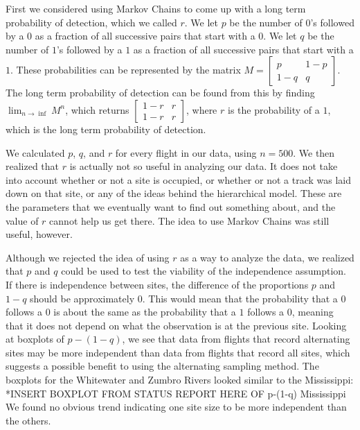 \documentclass{article}
\begin{document}
		First we considered using Markov Chains to come up with a long term 
probability of detection, which we called \(r\).  We let \(p\) be the number of 
\(0\)'s followed by a \(0\) as a fraction of all successive pairs that start 
with a \(0\).  We let \(q\) be the number of \(1\)'s followed by a \(1\) as a 
fraction of all successive pairs that start with a \(1\).  These probabilities 
can be represented by the matrix \(M = \begin{bmatrix} p & 1-p \\ 1-q & q 
\end{bmatrix}\). The long term probability of detection can be found from this 
by finding \(\lim_{n \to \inf} M^n\), which returns \( \begin{bmatrix} 1-r & r 
\\ 1-r & r\end{bmatrix}\), where \(r\) is the probability of a \(1\), which is 
the long term probability of detection.  

	We calculated \(p\), \(q\), and \(r\) for every flight in our data, using 
\(n = 500\).  We then realized that \(r\) is actually not so useful in analyzing
our data.  It does not take into account whether or not a site is occupied, or 
whether or not a track was laid down on that site, or any of the ideas behind    
the hierarchical model.  These are the parameters that we eventually want to 
find out something about, and the value of \(r\) cannot help us get there.  The 
idea to use Markov Chains was still useful, however.  
	
	Although we rejected the idea of using \(r\) as a way to analyze the data, 
we realized that \(p\) and \(q\) could be used to test the viability of 
the independence assumption.  If there is independence between sites, the 
difference of the proportions \(p\) and \(1-q\) should be approximately \(0\). 
This would mean that the probability that a \(0\) follows a \(0\) is about the 
same as the probability that a \(1\) follows a \(0\), meaning that it does not 
depend on what the observation is at the previous site.  Looking at boxplots of 
\(p - (1-q)\), we see that data from flights that record alternating sites may 
be more independent than data from flights that record all sites, which suggests
a possible benefit to using the alternating sampling method.  The boxplots for 
the Whitewater and Zumbro Rivers looked similar to the Mississippi:  \\
*INSERT BOXPLOT FROM STATUS REPORT HERE OF p-(1-q) Mississippi \\
We found no obvious trend indicating one site size to be more independent than 
the others.  
\end{document}
